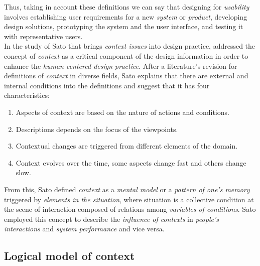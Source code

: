 Thus, taking in account these definitions we can say that designing for 
\textit{usability} involves establishing user requirements for a new
\textit{system} or \textit{product}, developing design solutions,
prototyping the system and the user interface, and testing it with
representative users.\\
In the study of Sato \cite{sato2004context} that brings \textit{context
issues} into design practice, addressed the concept of
\textit{context} as a critical component of the design information in
order to enhance the \textit{human-centered design practice}. After a
literature's revision for  definitions of \textit{context} in diverse
fields, Sato explains that there are external and internal conditions
into the definitions and suggest that it has four characteristics:
\begin{enumerate}  
\item Aspects of context are based on the nature of actions and 
conditions.
\item Descriptions depends on the focus of the viewpoints.
\item Contextual changes are triggered from different elements 
of the domain. 
\item Context evolves over the time, some aspects change fast
and others change slow. 
\end{enumerate} 
From this, Sato defined \textit{context} as a \textit{mental model} or a
\textit{pattern of one's memory} triggered by \textit{elements in the
situation}, where situation is a collective condition at the scene of
interaction composed of relations among \textit{variables of
conditions}. Sato employed this concept to describe the
\textit{influence of contexts} in \textit{people's interactions} and
\textit{system performance} and vice versa.

\subsection{Logical model of context} 

